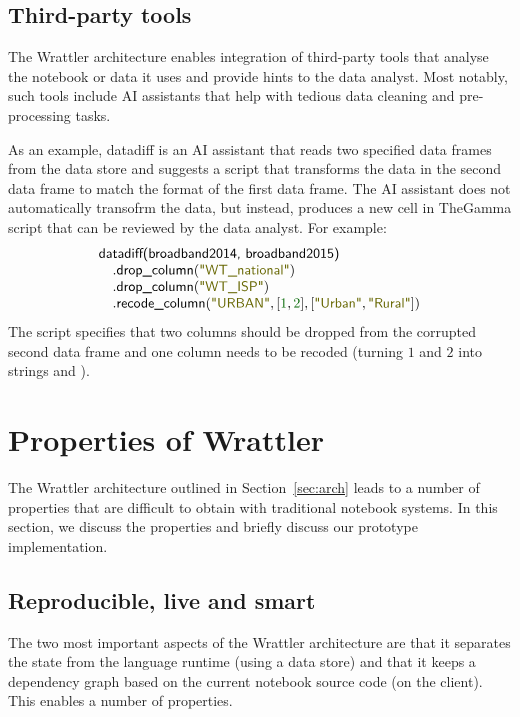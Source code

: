 \documentclass[sigplan]{acmart}\settopmatter{printfolios=true,printccs=false,printacmref=false}
\begin{document}
\subsection{Third-party tools}
\label{sec:comp-ai}

The Wrattler architecture enables integration of third-party tools that analyse the notebook
or data it uses and provide hints to the data analyst. Most notably, such tools include AI 
assistants that help with tedious data cleaning and pre-processing tasks. 

As an example, datadiff \cite{datadiff} is an AI assistant that reads two specified data frames from the
data store and suggests a script that transforms the data in the second data frame to match the
format of the first data frame. The AI assistant does not automatically transofrm the data, but
instead, produces a new cell in TheGamma script that can be reviewed by the data analyst. 
For example:
%
\begin{equation*}
\begin{array}{l}
\ident{datadiff(broadband2014, broadband2015)}\\
\quad.\ident{drop\_column}(\str{WT\_national})\\
\quad.\ident{drop\_column}(\str{WT\_ISP})\\
\quad.\ident{recode\_column}(\str{URBAN}, [\num{1}, \num{2}], [\str{Urban},\str{Rural}])
\end{array}  
\end{equation*}
%
The script specifies that two columns should be dropped from the corrupted second data frame and
one column needs to be recoded (turning $\num{1}$ and $\num{2}$ into strings
 and ). 

\section{Properties of Wrattler}
\label{sec:results}

The Wrattler architecture outlined in Section~\ref{sec:arch} leads to a number of properties that
are difficult to obtain with traditional notebook systems. In this section, we discuss the 
properties and briefly discuss our prototype implementation.

\subsection{Reproducible, live and smart}

The two most important aspects of the Wrattler architecture are that it separates the state from 
the language runtime (using a data store) and that it keeps a dependency graph based on the current
notebook source code (on the client). This enables a number of properties.
\end{document}
